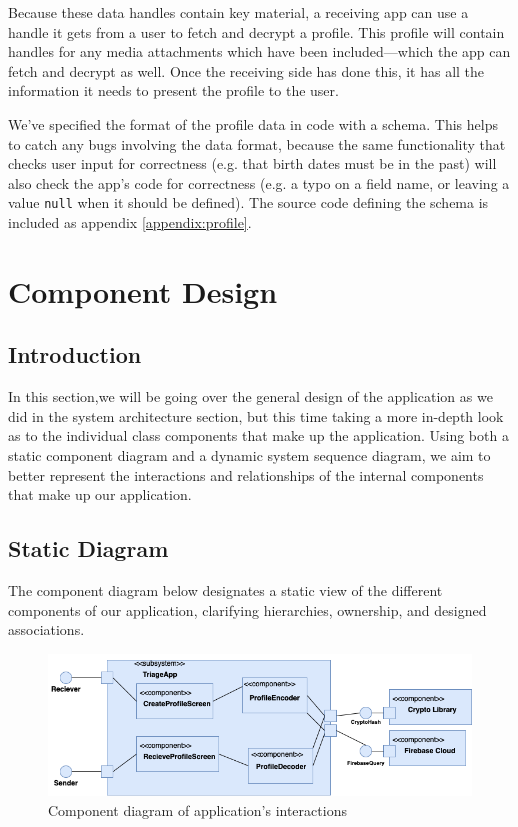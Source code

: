 \documentclass[11pt,letterpaper]{article}
\begin{document}
Because these data handles contain key material, a receiving app can use a handle it gets from a user to fetch and decrypt a profile. This profile will contain handles for any media attachments which have been included---which the app can fetch and decrypt as well. Once the receiving side has done this, it has all the information it needs to present the profile to the user.

We've specified the format of the profile data in code with a schema. This helps to catch any bugs involving the data format, because the same functionality that checks user input for correctness (e.g. that birth dates must be in the past) will also check the app's code for correctness (e.g. a typo on a field name, or leaving a value \verb|null| when it should be defined). The source code defining the schema is included as appendix \ref{appendix:profile}.


\section{Component Design}

\subsection{Introduction}

In this section,we will be going over the general design of the application as we did in the system architecture section, but this time taking a more in-depth look as to the individual class components that make up the application. Using both a static component diagram and a dynamic system sequence diagram, we aim to better represent the interactions and relationships of the internal components that make up our application.

\subsection{Static Diagram}

The component diagram below designates a static view of the different components of our application, clarifying hierarchies, ownership, and designed associations.

\begin{landscape}
\begin{figure}
    \centering
    \includegraphics[width=8in]{component.png}
    \caption{Component diagram of application's interactions}
    \label{a}
\end{figure}
\end{landscape}
\end{document}
